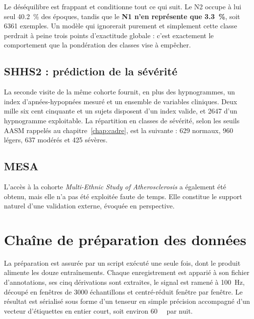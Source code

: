 Le déséquilibre est frappant et conditionne tout ce qui suit. Le N2 occupe à lui seul
\SI{40,2}{\percent} des époques, tandis que le \textbf{N1 n'en représente que
\SI{3,3}{\percent}}, soit \num{6361} exemples. Un modèle qui ignorerait purement et
simplement cette classe perdrait à peine trois points d'exactitude globale : c'est
exactement le comportement que la pondération des classes vise à empêcher.

\subsection{SHHS2 : prédiction de la sévérité}

La seconde visite de la même cohorte fournit, en plus des hypnogrammes, un index
d'apnées-hypopnées mesuré et un ensemble de variables cliniques. Deux mille six cent
cinquante et un sujets disposent d'un index valide, et \num{2647} d'un hypnogramme
exploitable. La répartition en classes de sévérité, selon les seuils AASM rappelés au
chapitre~\ref{chap:cadre}, est la suivante : \num{629} normaux, \num{960} légers,
\num{637} modérés et \num{425} sévères.

\subsection{MESA}

L'accès à la cohorte \emph{Multi-Ethnic Study of Atherosclerosis} a également été
obtenu, mais elle n'a pas été exploitée faute de temps. Elle constitue le support
naturel d'une validation externe, évoquée en perspective.

\section{Chaîne de préparation des données}

La préparation est assurée par un script exécuté une seule fois, dont le produit
alimente les douze entraînements. Chaque enregistrement est apparié à son fichier
d'annotations, ses cinq dérivations sont extraites, le signal est ramené à
\SI{100}{\hertz}, découpé en fenêtres de \num{3000} échantillons et centré-réduit
fenêtre par fenêtre. Le résultat est sérialisé sous forme d'un tenseur en simple
précision accompagné d'un vecteur d'étiquettes en entier court, soit environ
\SI{60}{\mega\octet} par nuit.

